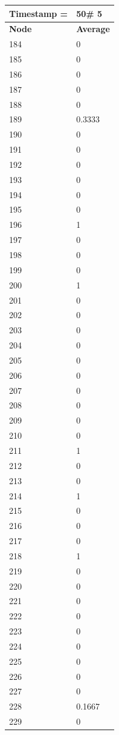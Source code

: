 \begin{tabular}{|l||l|}
\hline
\textbf{Timestamp =} & \textbf{50}\# 5\\\hline
	\textbf{Node} & \textbf{Average} \\ \hline
\hline
	184 & 0 \\ \hline
	185 & 0 \\ \hline
	186 & 0 \\ \hline
	187 & 0 \\ \hline
	188 & 0 \\ \hline
	189 & 0.3333 \\ \hline
	190 & 0 \\ \hline
	191 & 0 \\ \hline
	192 & 0 \\ \hline
	193 & 0 \\ \hline
	194 & 0 \\ \hline
	195 & 0 \\ \hline
	196 & 1 \\ \hline
	197 & 0 \\ \hline
	198 & 0 \\ \hline
	199 & 0 \\ \hline
	200 & 1 \\ \hline
	201 & 0 \\ \hline
	202 & 0 \\ \hline
	203 & 0 \\ \hline
	204 & 0 \\ \hline
	205 & 0 \\ \hline
	206 & 0 \\ \hline
	207 & 0 \\ \hline
	208 & 0 \\ \hline
	209 & 0 \\ \hline
	210 & 0 \\ \hline
	211 & 1 \\ \hline
	212 & 0 \\ \hline
	213 & 0 \\ \hline
	214 & 1 \\ \hline
	215 & 0 \\ \hline
	216 & 0 \\ \hline
	217 & 0 \\ \hline
	218 & 1 \\ \hline
	219 & 0 \\ \hline
	220 & 0 \\ \hline
	221 & 0 \\ \hline
	222 & 0 \\ \hline
	223 & 0 \\ \hline
	224 & 0 \\ \hline
	225 & 0 \\ \hline
	226 & 0 \\ \hline
	227 & 0 \\ \hline
	228 & 0.1667 \\ \hline
	229 & 0 \\ \hline
\end{tabular}
